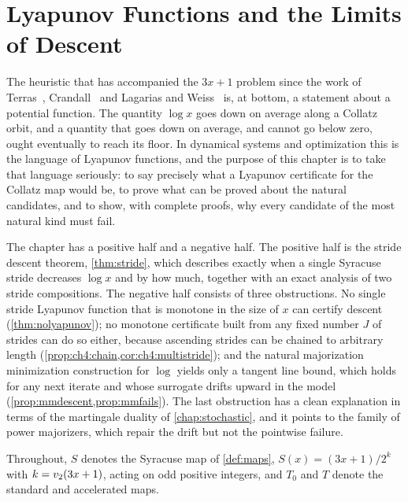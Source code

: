 \chapter{Lyapunov Functions and the Limits of Descent}\label{chap:lyapunov}

The heuristic that has accompanied the $3x+1$ problem since the work of
Terras~\cite{terras1976}, Crandall~\cite{crandall1978} and Lagarias and Weiss~\cite{lagarias1992} is, at
bottom, a statement about a potential function.  The quantity $\log x$ goes
down on average along a Collatz orbit, and a quantity that goes down on
average, and cannot go below zero, ought eventually to reach its floor.  In dynamical systems and optimization this is the language of Lyapunov functions, and the purpose of this chapter is to take that language
seriously: to say precisely what a Lyapunov certificate for the Collatz map
would be, to prove what can be proved about the natural candidates, and to
show, with complete proofs, why every candidate of the most natural kind must
fail.

The chapter has a positive half and a negative half.  The positive half is the
stride descent theorem, \cref{thm:stride}, which describes exactly when a
single Syracuse stride decreases $\log x$ and by how much, together with an
exact analysis of two stride compositions.  The negative half consists of
three obstructions.  No single stride Lyapunov function that is monotone in
the size of $x$ can certify descent (\cref{thm:nolyapunov}); no monotone certificate
built from any fixed number $J$ of strides can do so either, because ascending
strides can be chained to arbitrary length
(\cref{prop:ch4:chain,cor:ch4:multistride}); and the natural majorization
minimization construction for $\log$ yields only a tangent line bound,
which holds for any next iterate and whose surrogate drifts upward in the model
(\cref{prop:mmdescent,prop:mmfails}).  The last
obstruction has a clean explanation in terms of the martingale duality of
\cref{chap:stochastic}, and it points to the family of power majorizers, which
repair the drift but not the pointwise failure.

Throughout, $S$ denotes the Syracuse map of \cref{def:maps},
$S(x)=(3x+1)/2^{k}$ with $k=v_2(3x+1)$, acting on odd positive integers, and
$T_0$ and $T$ denote the standard and accelerated maps.

